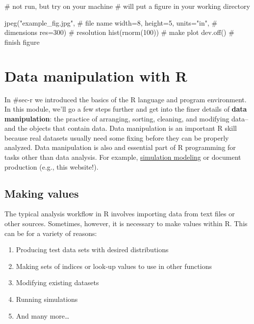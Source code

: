 \documentclass[
  13,
  letterpaper,
]{report}
\newenvironment{Shaded}{\begin{snugshade}}{\end{snugshade}}
\newcommand{\AttributeTok}[1]{\textcolor[rgb]{0.40,0.45,0.13}{#1}}
\newcommand{\CommentTok}[1]{\textcolor[rgb]{0.37,0.37,0.37}{#1}}
\newcommand{\DecValTok}[1]{\textcolor[rgb]{0.68,0.00,0.00}{#1}}
\newcommand{\FunctionTok}[1]{\textcolor[rgb]{0.28,0.35,0.67}{#1}}
\newcommand{\NormalTok}[1]{\textcolor[rgb]{0.00,0.23,0.31}{#1}}
\newcommand{\StringTok}[1]{\textcolor[rgb]{0.13,0.47,0.30}{#1}}
\providecommand{\tightlist}{%
  \setlength{\itemsep}{0pt}\setlength{\parskip}{0pt}}
\begin{document}
\begin{Shaded}
\begin{Highlighting}[]
\CommentTok{\# not run, but try on your machine}
\CommentTok{\# will put a figure in your working directory}

\FunctionTok{jpeg}\NormalTok{(}\StringTok{"example\_fig.jpg"}\NormalTok{,             }\CommentTok{\# file name}
     \AttributeTok{width=}\DecValTok{8}\NormalTok{, }\AttributeTok{height=}\DecValTok{5}\NormalTok{, }\AttributeTok{units=}\StringTok{"in"}\NormalTok{, }\CommentTok{\# dimensions}
     \AttributeTok{res=}\DecValTok{300}\NormalTok{)                       }\CommentTok{\# resolution}
\FunctionTok{hist}\NormalTok{(}\FunctionTok{rnorm}\NormalTok{(}\DecValTok{100}\NormalTok{))                    }\CommentTok{\# make plot}
\FunctionTok{dev.off}\NormalTok{()                           }\CommentTok{\# finish figure}
\end{Highlighting}
\end{Shaded}

\chapter{Data manipulation with R}\label{sec-manip}

In \#sec-r we introduced the basics of the R language and program
environment. In this module, we'll go a few steps further and get into
the finer details of \textbf{data manipulation}: the practice of
arranging, sorting, cleaning, and modifying data--and the objects that
contain data. Data manipulation is an important R skill because real
datasets usually need some fixing before they can be properly analyzed.
Data manipulation is also and essential part of R programming for tasks
other than data analysis. For example,
\href{https://doi.org/10.5066/P935Y7NO}{simulation modeling} or document
production (e.g., this website!).

\section{Making values}\label{sec-manip-make}

The typical analysis workflow in R involves importing data from text
files or other sources. Sometimes, however, it is necessary to make
values within R. This can be for a variety of reasons:

\begin{enumerate}
\def\labelenumi{\arabic{enumi}.}
\tightlist
\item
  Producing test data sets with desired distributions
\item
  Making sets of indices or look-up values to use in other functions
\item
  Modifying existing datasets
\item
  Running simulations
\item
  And many more\ldots{}
\end{enumerate}
\end{document}
